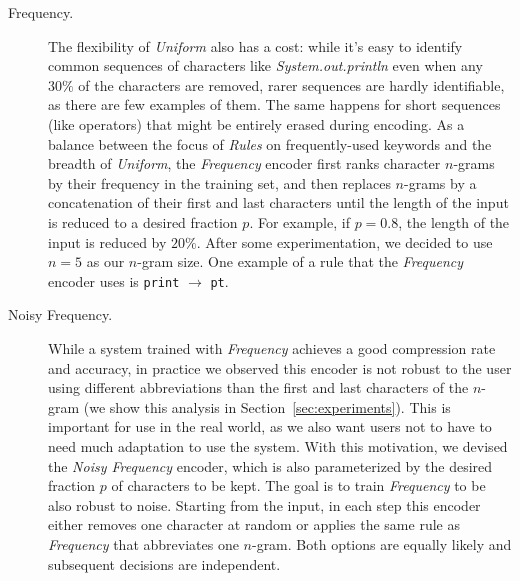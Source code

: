 \documentclass{article}
\begin{document}
\begin{description}
    \item[Frequency. ]{
        The flexibility of \emph{Uniform} also has a
        cost: while it's easy to identify common
        sequences of characters like \emph{System.out.println} even when any
        $30\%$ of the characters are removed, rarer
        sequences are hardly identifiable, as there
        are few examples of them. The same happens
        for short sequences (like operators) that
        might be entirely erased during encoding.
        As a balance between the focus of \emph{Rules}
        on frequently-used keywords and the breadth
        of \emph{Uniform}, the \emph{Frequency}
        encoder first ranks character $n$-grams by
        their frequency in the training set, and then
        replaces $n$-grams by a concatenation of
        their first and last characters until the length
        of the input is reduced to a desired fraction $p$. For example, if $p = 0.8$, the length
        of the input is reduced by $20\%$.
        After some experimentation, we decided
        to use $n = 5$ as our $n$-gram size.
        One example of a rule that the
        \emph{Frequency} encoder uses is
        \texttt{print} $\rightarrow$ \texttt{pt}.
    }
    \item[Noisy Frequency. ]{
        While a system trained with
        \emph{Frequency} achieves a good
        compression rate and accuracy, in practice we
        observed this encoder is not robust to
        the user using different abbreviations
        than the first and last characters of the
        $n$-gram (we show this analysis in
        Section~\ref{sec:experiments}). This is important for use in the
        real world, as we also want users not to have
        to need much adaptation to use the system.
        With this motivation, we devised the
        \emph{Noisy Frequency} encoder, which is
        also parameterized by the desired fraction $p$
        of characters to be kept. The goal is to train
        \emph{Frequency} to be also robust to noise.
        Starting from the
        input, in each step this encoder either removes
        one character at random or applies the
        same rule as \emph{Frequency} that abbreviates
        one $n$-gram. Both options are equally likely
        and subsequent decisions are independent.
    }
\end{description}
\end{document}

